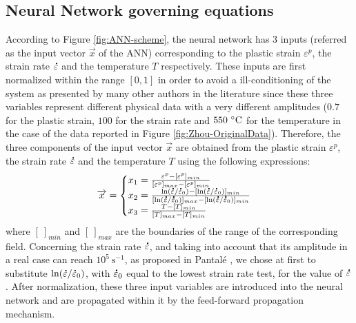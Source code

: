 \documentclass[algorithms,article,submit,pdftex,moreauthors]{Definitions/mdpi}
\DeclareRobustCommand{\mdot}[1]{\accentset{\mbox{\bfseries .}}{#1}}
\DeclareRobustCommand{\ps}{\text{s}^{-1}}
\begin{document}
\subsection{Neural Network governing equations}\label{sec:ANN-equations}

According to Figure \ref{fig:ANN-scheme}, the neural network has $3$ inputs (referred as the input vector $\overrightarrow{x}$ of the ANN) corresponding to the plastic strain $\varepsilon^p$, the strain rate $\mdot\varepsilon$ and the temperature $T$ respectively.
These inputs are first normalized within the range $[0,1]$ in order to avoid a ill-conditioning of the system as presented by many other authors in the literature \cite{Lin-2008-ANN, Lu-2011-ANN} since these three variables represent different physical data with a very different amplitudes ($0.7$ for the plastic strain, $100$ for the strain rate and $550~\celsius$ for the temperature in the case of the data reported in Figure \ref{fig:Zhou-OriginalData}).
Therefore, the three components of the input vector $\overrightarrow{x}$ are obtained from the plastic strain $\varepsilon^p$, the strain rate $\mdot\varepsilon$ and the temperature $T$ using the following expressions:
\begin{equation}
\overrightarrow{x}=
\begin{cases}
x_1 = \frac{\varepsilon^p - [\varepsilon^p]_{min}}{[\varepsilon^p]_{max} - [\varepsilon^p]_{min}}\\
x_2 = \frac{\ln(\mdot\varepsilon/\mdot\varepsilon_0)-[\ln(\mdot\varepsilon/\mdot\varepsilon_0)]_{min}}{[\ln(\mdot\varepsilon/\mdot\varepsilon_0)]_{max}-[\ln(\mdot\varepsilon/\mdot\varepsilon_0)]_{min}}\label{eq:CR1}\\
x_3 = \frac{T-[T]_{min}}{[T]_{max}-[T]_{min}}
\end{cases}
\end{equation}
where $[~]_{min}$ and $[~]_{max}$  are the boundaries of the range of the corresponding field.
Concerning the strain rate $\mdot\varepsilon$, and taking into account that its amplitude in a real case can reach $10^5~\ps$, as proposed in Pantalé \cite{Pantale-2021}, we chose at first to substitute $\ln(\mdot\varepsilon/\mdot\varepsilon_0)$, with $\mdot\varepsilon_0$ equal to the lowest strain rate test, for the value of $\mdot\varepsilon$.
After normalization, these three input variables are introduced into the neural network and are propagated within it by the feed-forward propagation mechanism.
\end{document}
